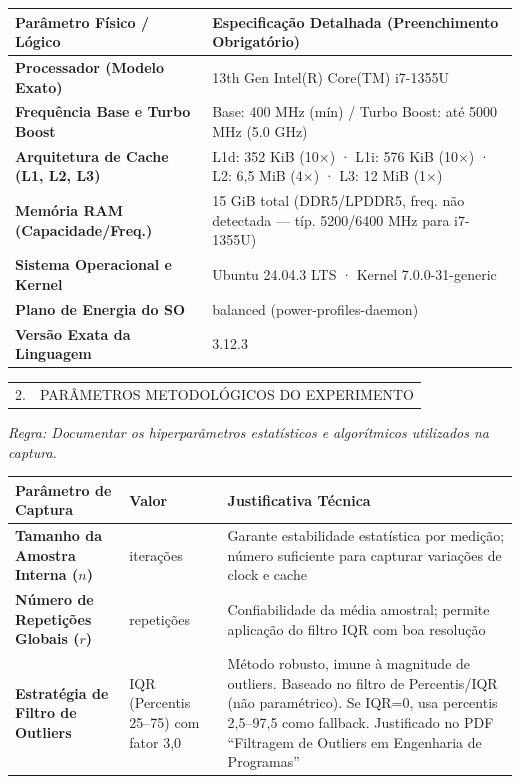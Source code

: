 \documentclass[12pt,a4paper]{article}
\makeatletter
\newcommand{\secaotitulo}[2]{%
  \noindent\begin{tabular}{@{}p{0.7cm}p{15.9cm}@{}}
  #1. & \large\MakeUppercase{#2}
  \end{tabular}\par
}
\makeatother
\begin{document}
\vspace{0.38cm}
\begin{tabularx}{\textwidth}{@{}>{\bfseries}X X@{}}
\toprule
Parâmetro Físico / Lógico & Especificação Detalhada (Preenchimento Obrigatório)\\
\midrule
Processador (Modelo Exato) & 13th Gen Intel(R) Core(TM) i7-1355U \\
Frequência Base e Turbo Boost & Base: 400 MHz (mín) / Turbo Boost: até 5000 MHz (5.0 GHz) \\
Arquitetura de Cache (L1, L2, L3) & L1d: 352 KiB (10×) · L1i: 576 KiB (10×) · L2: 6,5 MiB (4×) · L3: 12 MiB (1×) \\
Memória RAM (Capacidade/Freq.) & 15 GiB total (DDR5/LPDDR5, freq. não detectada — típ. 5200/6400 MHz para i7-1355U) \\
Sistema Operacional e Kernel & Ubuntu 24.04.3 LTS · Kernel 7.0.0-31-generic\\
Plano de Energia do SO & balanced (power-profiles-daemon) \\
Versão Exata da Linguagem & 3.12.3 \\ 
\bottomrule
\end{tabularx}

\vspace{0.62cm}
\secaotitulo{2}{Parâmetros Metodológicos do Experimento}

\vspace{0.35cm}
\textit{Regra: Documentar os hiperparâmetros estatísticos e algorítmicos utilizados na captura.}

\vspace{0.38cm}
\begin{tabularx}{\textwidth}{@{}>{\bfseries}X >{\centering\arraybackslash}p{1.4cm} X@{}}
\toprule
Parâmetro de Captura & Valor & Justificativa Técnica\\
\midrule
Tamanho da Amostra Interna ($n$) & 10.000 iterações & Garante estabilidade estatística por medição; número suficiente para capturar variações de clock e cache \\
Número de Repetições Globais ($r$) & 300 repetições & Confiabilidade da média amostral; permite aplicação do filtro IQR com boa resolução \\
Estratégia de Filtro de Outliers & IQR (Percentis 25--75) com fator 3,0 & Método robusto, imune à magnitude de outliers. Baseado no filtro de Percentis/IQR (não paramétrico). Se IQR=0, usa percentis 2,5--97,5 como fallback. Justificado no PDF ``Filtragem de Outliers em Engenharia de Programas'' \\
\bottomrule
\end{tabularx}
\end{document}
